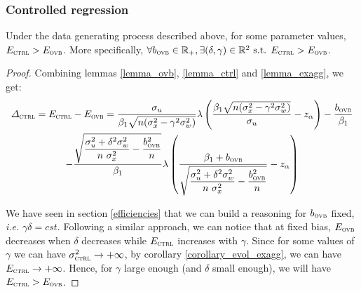 \documentclass[a4paper, 11pt]{report}
\begin{document}
				\subsubsection{Controlled regression}
			
            				\begin{proposition}\label{proof_trade_off_ctrl}
            					Under the data generating process described above, for some parameter values, $E_{\textsc{ctrl}} > E_{\textsc{ovb}}$. More specifically, $\forall b_{\textsc{ovb}} \in \mathbb{R}_{+}, \exists (\delta, \gamma) \in \mathbb{R}^{2} \text{ s.t. } E_{\textsc{ctrl}} > E_{\textsc{ovb}}$.
            				\end{proposition}
				
					\begin{proof}
						Combining lemmas \ref{lemma_ovb}, \ref{lemma_ctrl} and \ref{lemma_exagg}, we get:
            				~
                                		\begin{multline*}
                                			\varDelta_{\textsc{ctrl}} = E_{\textsc{ctrl}} - E_{\textsc{ovb}} = 
                                				\dfrac{\sigma_{u}}{\beta_{1}\sqrt{n(\sigma_{x}^{2} - \gamma^{2}\sigma_{w}^{2})}}
				  \lambda \left( \dfrac{\beta_{1}\sqrt{n(\sigma_{x}^{2} - \gamma^{2}\sigma_{w}^{2})}}{\sigma_{u}} - z_{\alpha} \right) - 
                                				\dfrac{b_{\textsc{ovb}}}{\beta_{1}} \\
                                				- \dfrac{\sqrt{ \dfrac{ \sigma_{u}^{2} +  \delta^{2} \sigma_{w}^{2}}{n \ \sigma_{x}^{2}}  - \dfrac{b_{\textsc{ovb}}^{2}}{n}}}{\beta_{1}}
                                				 \lambda \left( \dfrac{  \beta_{1} + b_{\textsc{ovb}} }{\sqrt{\dfrac{ \sigma_{u}^{2} +  \delta^{2} \sigma_{w}^{2}}{n \ \sigma_{x}^{2}}  - \dfrac{b_{\textsc{ovb}}^{2}}{n}}} - z_{\alpha} \right)
                                		\end{multline*}
		
					We have seen in section \ref{efficiencies} that we can build a reasoning for $b_{\textsc{ovb}}$ fixed, \textit{i.e.} $\gamma \delta = cst$. Following a similar approach, we can notice that at fixed bias, $E_{\textsc{ovb}}$ decreases when $\delta$ decreases while $E_{\textsc{ctrl}}$ increases with $\gamma$. Since for some values of $\gamma$ we can have $\sigma_{\textsc{ctrl}}^{2} \to + \infty$, by corollary \ref{corollary_evol_exagg}, we can have $E_{\textsc{ctrl}} \to + \infty$. Hence, for $\gamma$ large enough (and $\delta$ small enough), we will have $E_{\textsc{ctrl}} > E_{\textsc{ovb}}$.
					\end{proof}
\end{document}
